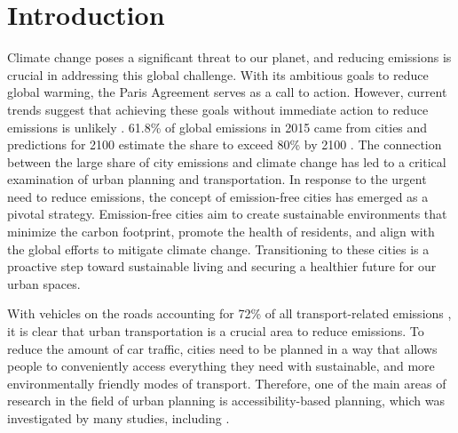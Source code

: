 \clearpage
\section{Introduction}
\label{sec:introduction}


Climate change poses a significant threat to our planet, and reducing emissions is crucial in addressing this global challenge.
With its ambitious goals to reduce global warming, the Paris Agreement serves as a call to action.
However, current trends suggest that achieving these goals without immediate action to reduce emissions is unlikely .
61.8\% of global emissions in 2015 came from cities and predictions for 2100 estimate the share to exceed 80\% by 2100 .
The connection between the large share of city emissions and climate change has led to a critical examination of urban planning and transportation.
In response to the urgent need to reduce emissions, the concept of emission-free cities has emerged as a pivotal strategy.
Emission-free cities aim to create sustainable environments that minimize the carbon footprint, promote the health of residents, and align with the global efforts to mitigate climate change.
Transitioning to these cities is a proactive step toward sustainable living and securing a healthier future for our urban spaces.


With vehicles on the roads accounting for 72\% of all transport-related emissions , it is clear that urban transportation is a crucial area to reduce emissions.
To reduce the amount of car traffic, cities need to be planned in a way that allows people to conveniently access everything they need with sustainable, and more environmentally friendly modes of transport.
Therefore, one of the main areas of research in the field of urban planning is accessibility-based planning, which was investigated by many studies, including .

